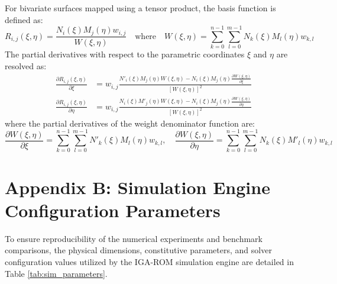 For bivariate surfaces mapped using a tensor product, the basis function is defined as:
\begin{equation}
    R_{i,j}(\xi, \eta) = \frac{N_i(\xi) M_j(\eta) w_{i,j}}{W(\xi, \eta)} \quad \text{where} \quad W(\xi, \eta) = \sum_{k=0}^{n-1}\sum_{l=0}^{m-1} N_k(\xi) M_l(\eta) w_{k,l}
\end{equation}
The partial derivatives with respect to the parametric coordinates $\xi$ and $\eta$ are resolved as:
\begin{align}
    \frac{\partial R_{i,j}(\xi, \eta)}{\partial \xi} &= w_{i,j} \frac{N'_i(\xi) M_j(\eta) W(\xi, \eta) - N_i(\xi) M_j(\eta) \frac{\partial W(\xi, \eta)}{\partial \xi}}{[W(\xi, \eta)]^2} \\
    \frac{\partial R_{i,j}(\xi, \eta)}{\partial \eta} &= w_{i,j} \frac{N_i(\xi) M'_j(\eta) W(\xi, \eta) - N_i(\xi) M_j(\eta) \frac{\partial W(\xi, \eta)}{\partial \eta}}{[W(\xi, \eta)]^2}
\end{align}
where the partial derivatives of the weight denominator function are:
\begin{equation}
    \frac{\partial W(\xi, \eta)}{\partial \xi} = \sum_{k=0}^{n-1}\sum_{l=0}^{m-1} N'_k(\xi) M_l(\eta) w_{k,l}, \quad \frac{\partial W(\xi, \eta)}{\partial \eta} = \sum_{k=0}^{n-1}\sum_{l=0}^{m-1} N_k(\xi) M'_l(\eta) w_{k,l}
\end{equation}

\newpage

\section*{Appendix B: Simulation Engine Configuration Parameters}
To ensure reproducibility of the numerical experiments and benchmark comparisons, the physical dimensions, constitutive parameters, and solver configuration values utilized by the IGA-ROM simulation engine are detailed in Table \ref{tab:sim_parameters}.

